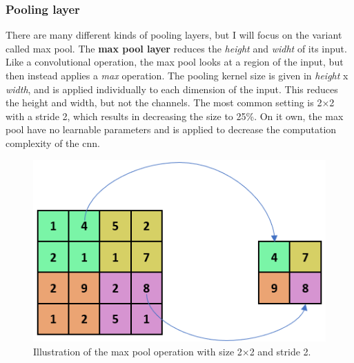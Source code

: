     
    
\subsubsection{Pooling layer}
    There are many different kinds of pooling layers, but I will focus on the variant called max pool. The \textbf{max pool layer} reduces the \textit{height} and \textit{widht} of its input\cite{o2015introduction_convolutions}. Like a convolutional operation, the max pool looks at a region of the input, but then instead applies a \textit{max} operation. The pooling kernel size is given in \textit{height} x \textit{width}, and is applied individually to each dimension of the input. This reduces the height and width, but not the channels. The most common setting is 2×2 with a stride 2, which results in decreasing the size to 25\%. On it own, the max pool have no learnable parameters and is applied to decrease the computation complexity of the \gls{cnn}.

    \begin{figure}[H]
        \centering
        \includegraphics[scale=0.5]{figures/max_pool.png}
        \caption[The max pool operation]{Illustration of the max pool operation with size 2×2 and stride 2.}
      	\medskip 
        \label{maxpool_fig}
    \end{figure}

